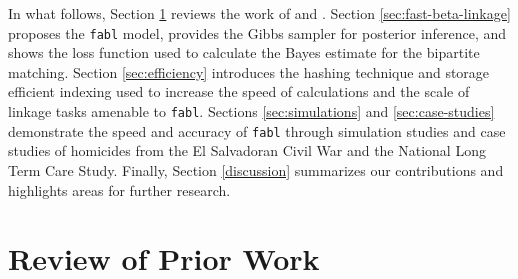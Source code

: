 \documentclass[ba]{imsart}
\begin{document}

In what follows, Section \ref{sec:review-of_prior-work} reviews the work of \cite{fellegi_theory_1969} and \cite{sadinle_bayesian_2017}. Section \ref{sec:fast-beta-linkage} proposes the \texttt{fabl} model, provides the Gibbs sampler for posterior inference, and shows the loss function used to calculate the Bayes estimate for the bipartite matching. Section \ref{sec:efficiency} introduces the hashing technique and storage efficient indexing used to increase the speed of calculations and the scale of linkage tasks amenable to \texttt{fabl}. Sections \ref{sec:simulations} and \ref{sec:case-studies} demonstrate the speed and accuracy of \texttt{fabl} through simulation studies and case studies of homicides from the El Salvadoran Civil War and the National Long Term Care Study. Finally, Section \ref{discussion} summarizes our contributions and highlights areas for further research.

\section{Review of Prior Work}
\label{sec:review-of_prior-work}
\end{document}
